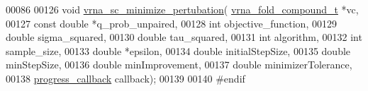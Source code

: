 \begin{DoxyCode}
00086 
00126 \textcolor{keywordtype}{void} \hyperlink{group__soft__constraints_gaa124bdc20d88001c38ade590c4bcc3c4}{vrna\_sc\_minimize\_pertubation}(
      \hyperlink{group__fold__compound_structvrna__fc__s}{vrna\_fold\_compound\_t} *vc,
00127                                   \textcolor{keyword}{const} \textcolor{keywordtype}{double} *q\_prob\_unpaired,
00128                                   \textcolor{keywordtype}{int} objective\_function,
00129                                   \textcolor{keywordtype}{double} sigma\_squared,
00130                                   \textcolor{keywordtype}{double} tau\_squared,
00131                                   \textcolor{keywordtype}{int} algorithm,
00132                                   \textcolor{keywordtype}{int} sample\_size,
00133                                   \textcolor{keywordtype}{double} *epsilon,
00134                                   \textcolor{keywordtype}{double} initialStepSize,
00135                                   \textcolor{keywordtype}{double} minStepSize,
00136                                   \textcolor{keywordtype}{double} minImprovement,
00137                                   \textcolor{keywordtype}{double} minimizerTolerance,
00138                                   \hyperlink{group__soft__constraints_gaa715397c7afd2d2955c315512a3d571a}{progress\_callback} callback);
00139 
00140 \textcolor{preprocessor}{#endif}
\end{DoxyCode}

